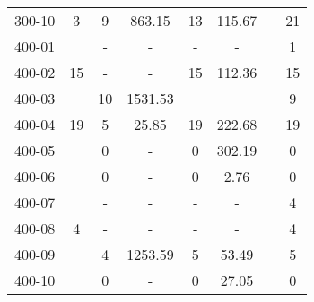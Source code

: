 \begin{tabular}{ l|c|cc|cc|cc  }
300-10	&3	&9	&863.15	&13	&115.67	&	&21\\
400-01	&	&-	&-	&-	&-	&	&1\\
400-02	&15	&-	&-	&15	&112.36	&	&15\\
400-03	&	&10	&1531.53	&	&	&	&9\\
400-04	&19	&5	&25.85	&19	&222.68	&	&19\\
400-05	&	&0	&-	&0	&302.19	&	&0\\
400-06	&	&0	&-	&0	&2.76	&	&0\\
400-07	&	&-	&-	&-	&-	&	&4\\
400-08	&4	&-	&-	&-	&-	&	&4\\
400-09	&	&4	&1253.59	&5	&53.49	&	&5\\
400-10	&	&0	&-	&0	&27.05	&	&0\\
\hline                        
\end{tabular}
